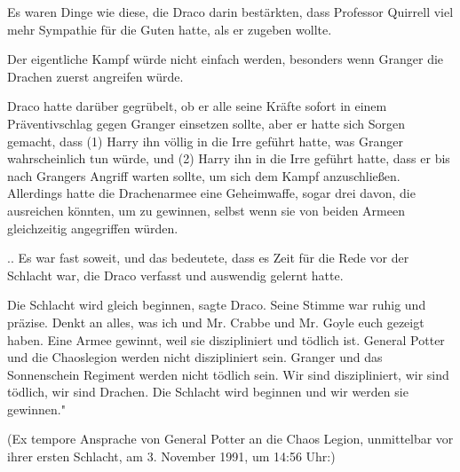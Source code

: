 Es waren Dinge wie diese, die Draco darin bestärkten, dass Professor Quirrell
viel mehr Sympathie für die Guten hatte, als er zugeben wollte.

Der eigentliche Kampf würde nicht einfach werden, besonders wenn Granger die
Drachen zuerst angreifen würde.

Draco hatte darüber gegrübelt, ob er alle seine Kräfte sofort in einem
Präventivschlag gegen Granger einsetzen sollte, aber er hatte sich Sorgen
gemacht, dass (1) Harry ihn völlig in die Irre geführt hatte, was Granger
wahrscheinlich tun würde, und (2) Harry ihn in die Irre geführt hatte, dass er
bis nach Grangers Angriff warten sollte, um sich dem Kampf anzuschließen.
Allerdings hatte die Drachenarmee eine Geheimwaffe, sogar drei davon, die
ausreichen könnten, um zu gewinnen, selbst wenn sie von beiden Armeen
gleichzeitig angegriffen würden.

.. Es war fast soweit, und das bedeutete, dass es Zeit für die Rede vor der
Schlacht war, die Draco verfasst und auswendig gelernt hatte.

\glqq Die Schlacht wird gleich beginnen\grqq{}, sagte Draco. Seine Stimme war
ruhig und präzise. \glqq Denkt an alles, was ich und Mr. Crabbe und Mr. Goyle
euch gezeigt haben. Eine Armee gewinnt, weil sie diszipliniert und tödlich ist.
General Potter und die Chaoslegion werden nicht diszipliniert sein. Granger und
das Sonnenschein Regiment werden nicht tödlich sein. Wir sind diszipliniert, wir
sind tödlich, wir sind Drachen. Die Schlacht wird beginnen und wir werden sie
gewinnen."

(Ex tempore Ansprache von General Potter an die Chaos Legion, unmittelbar vor
ihrer ersten Schlacht, am 3. November 1991, um 14:56 Uhr:)

